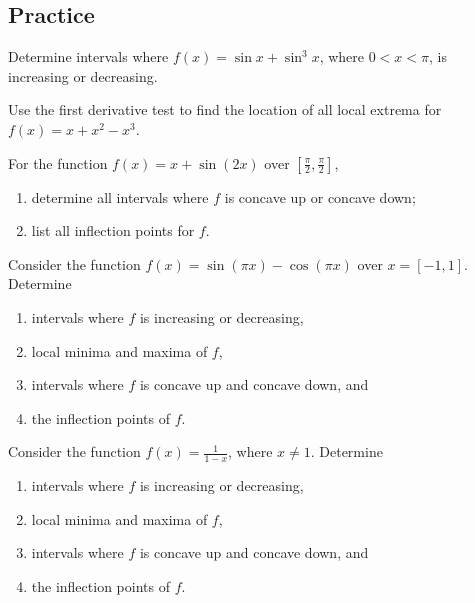 \subsection{Practice}

\begin{exercise}

Determine intervals where \(f(x)=\sin x+\sin^3x\), where \(0<x<\pi\), is
increasing or decreasing.

\end{exercise}
\vspace*{6\baselineskip}

\begin{exercise}

Use the first derivative test to find the location of all local extrema
for \(f(x)=x+x^2 - x^3\).

\end{exercise}
\vspace*{6\baselineskip}

\begin{exercise}

For the function \(f(x)=x+\sin(2x)\) over
\([\frac{\pi}{2},\frac{\pi}{2}]\),

\begin{enumerate}
\item
  determine all intervals where \(f\) is concave up or concave down;
\item
  list all inflection points for \(f\).
\end{enumerate}

\end{exercise}

\begin{exercise}

Consider the function \(f(x)=\sin(\pi x)-\cos(\pi x)\) over
\(x=[-1,1]\). Determine

\begin{enumerate}
\item
  intervals where \(f\) is increasing or decreasing,
\item
  local minima and maxima of \(f\),
\item
  intervals where \(f\) is concave up and concave down, and
\item
  the inflection points of \(f\).
\end{enumerate}

\end{exercise}

\begin{exercise}

Consider the function \(f(x)=\frac{1}{1 - x}\), where \(x\neq 1\).
Determine

\begin{enumerate}
\item
  intervals where \(f\) is increasing or decreasing,
\item
  local minima and maxima of \(f\),
\item
  intervals where \(f\) is concave up and concave down, and
\item
  the inflection points of \(f\).
\end{enumerate}

\end{exercise}

